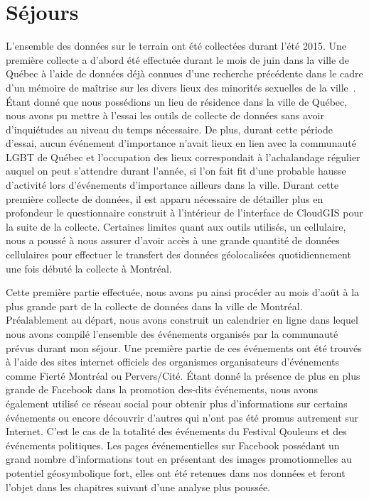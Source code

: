 \section{Séjours}
\label{sec:s_jours}
L'ensemble des données sur le terrain ont été collectées durant l'été 2015. 
Une première collecte a d'abord été effectuée durant le mois de juin dans la ville de Québec à l'aide de données déjà connues d'une recherche précédente dans le cadre d'un mémoire de maîtrise sur les divers lieux des minorités sexuelles de la ville~\citep{Vachon2014}. 
Étant donné que nous possédions un lieu de résidence dans la ville de Québec, nous avons pu mettre à l'essai les outils de collecte de données sans avoir d'inquiétudes au niveau du temps nécessaire. 
De plus, durant cette période d'essai, aucun événement d'importance n'avait lieux en lien avec la communauté LGBT de Québec et l'occupation des lieux correspondait à l'achalandage régulier auquel on peut s'attendre durant l'année, si l'on fait fit d'une probable hausse d'activité lors d'événements d'importance ailleurs dans la ville. 
Durant cette première collecte de données, il est apparu nécessaire de détailler plus en profondeur le questionnaire construit à l'intérieur de l'interface de CloudGIS pour la suite de la collecte. 
Certaines limites quant aux outils utilisés, un cellulaire, nous a poussé à nous assurer d'avoir accès à une grande quantité de données cellulaires pour effectuer le transfert des données géolocalisées quotidiennement une fois débuté la collecte à Montréal.

Cette première partie effectuée, nous avons pu ainsi procéder au mois d'août à la plus grande part de la collecte de données dans la ville de Montréal.
Préalablement au départ, nous avons construit un calendrier en ligne dans lequel nous avons compilé l'ensemble des événements organisés par la communauté \lgbt{} prévus durant mon séjour. 
Une première partie de ces événements ont été trouvés à l'aide des sites internet officiels des organismes organisateurs d'événements comme Fierté Montréal ou Pervers/Cité. 
Étant donné la présence de plus en plus grande de Facebook dans la promotion des-dits événements, nous avons également utilisé ce réseau social pour obtenir plus d'informations sur certains événements ou encore découvrir d'autres qui n'ont pas été promus autrement sur  Internet. 
C'est le cas de la totalité des événements du Festival Qouleurs et des événements politiques. 
Les pages événementielles sur Facebook possédant un grand nombre d'informations tout en présentant des images promotionnelles au potentiel géosymbolique fort, elles ont été retenues dans nos données et feront l'objet dans les chapitres suivant d'une analyse plus poussée.

